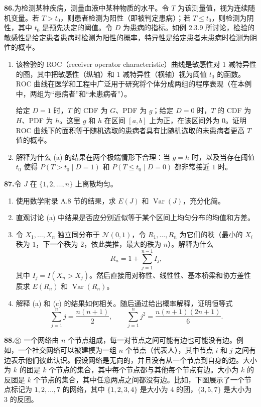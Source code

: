 \documentclass[UTF8, 12pt, fontset=fandol, oneside]{ctexart}
\begin{document}
\noindent\textbf{86.}\quad 为检测某种疾病，测量血液中某种物质的水平。令 $T$ 为该测量值，视为连续随机变量。若 $T>t_0$，则患者检测为阳性（即被判定患病）；若 $T\le t_0$，则检测为阴性，其中 $t_0$ 是预先决定的阈值。令 $D$ 为患病的指标。如例 2.3.9 所讨论，检验的敏感性是给定患者患病时检测为阳性的概率，特异性是给定患者未患病时检测为阴性的概率。
\begin{enumerate}
  \item[(a)] 该检验的 ROC（receiver operator characteristic）曲线是敏感性对 $1$ 减特异性的图，其中把敏感性（纵轴）和 $1$ 减特异性（横轴）视为阈值 $t_0$ 的函数。ROC 曲线在医学和工程中广泛用于研究将个体分成两组的程序表现（在本例中，两组为“患病者”和“未患病者”）。

  给定 $D=1$ 时，$T$ 的 CDF 为 $G$、PDF 为 $g$；给定 $D=0$ 时，$T$ 的 CDF 为 $H$、PDF 为 $h$。这里 $g$ 和 $h$ 在区间 $[a,b]$ 上为正，在该区间外为 $0$。证明 ROC 曲线下的面积等于随机选取的患病者具有比随机选取的未患病者更高 $T$ 值的概率。
  \item[(b)] 解释为什么 (a) 的结果在两个极端情形下合理：当 $g=h$ 时，以及当存在阈值 $t_0$ 使得 $P(T>t_0\mid D=1)$ 和 $P(T\le t_0\mid D=0)$ 都非常接近 $1$ 时。
\end{enumerate}

\noindent\textbf{87.}\quad 令 $J$ 在 $\{1,2,\ldots,n\}$ 上离散均匀。
\begin{enumerate}
  \item[(a)] 使用数学附录 A.8 节的结果，求 $E(J)$ 和 $\operatorname{Var}(J)$，充分化简。
  \item[(b)] 直观讨论 (a) 中结果是否应分别近似等于某个区间上均匀分布的均值和方差。
  \item[(c)] 令 $X_1,\ldots,X_n$ 独立同分布于 $\mathcal{N}(0,1)$，令 $R_1,\ldots,R_n$ 为它们的秩（最小的 $X_i$ 秩为 $1$，下一个秩为 $2$，依此类推，最大的秩为 $n$）。解释为什么
  \[
    R_n=1+\sum_{j=1}^{n-1}I_j,
  \]
  其中 $I_j=I(X_n>X_j)$。然后直接用对称性、线性性、基本桥梁和协方差性质求 $E(R_n)$ 和 $\operatorname{Var}(R_n)$。
  \item[(d)] 解释 (a) 和 (c) 的结果如何相关。随后通过给出概率解释，证明恒等式
  \[
    \sum_{j=1}^{n}j=\frac{n(n+1)}{2},\qquad
    \sum_{j=1}^{n}j^2=\frac{n(n+1)(2n+1)}{6}.
  \]
\end{enumerate}

\noindent\textbf{88.}\quad $\circledS$ 一个网络由 $n$ 个节点组成，每一对节点之间可能有边也可能没有边。例如，一个社交网络可以被建模为一组 $n$ 个节点（代表人），其中节点 $i$ 和 $j$ 之间有边表示他们彼此认识。假设网络是无向的，并且没有从一个节点到自身的边。大小为 $k$ 的团是 $k$ 个节点的集合，其中每个节点都与其他每个节点有边。大小为 $k$ 的反团是 $k$ 个节点的集合，其中任意两点之间都没有边。比如，下图展示了一个节点标记为 $1,2,\ldots,7$ 的网络，其中 $\{1,2,3,4\}$ 是大小为 $4$ 的团，$\{3,5,7\}$ 是大小为 $3$ 的反团。
\end{document}
